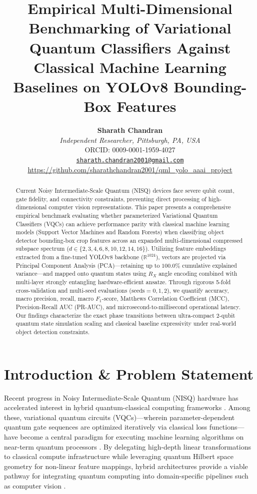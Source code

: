 \documentclass[10pt,twocolumn,letterpaper]{article}
\title{\Large\bfseries Empirical Multi-Dimensional Benchmarking of Variational Quantum Classifiers Against Classical Machine Learning Baselines on YOLOv8 Bounding-Box Features}
\author{
    \textbf{Sharath Chandran} \\
    \textit{Independent Researcher, Pittsburgh, PA, USA} \\
    ORCID: 0009-0001-1959-4027 \\
    \href{mailto:sharath.chandran2001@gmail.com}{\texttt{sharath.chandran2001@gmail.com}} \\
    \url{https://github.com/sharathchandran2001/qml_yolo_aaai_project}
}
\date{}
\begin{document}
\maketitle

\begin{abstract}
Current Noisy Intermediate-Scale Quantum (NISQ) devices face severe qubit count, gate fidelity, and connectivity constraints, preventing direct processing of high-dimensional computer vision representations. This paper presents a comprehensive empirical benchmark evaluating whether parameterized Variational Quantum Classifiers (VQCs) can achieve performance parity with classical machine learning models (Support Vector Machines and Random Forests) when classifying object detector bounding-box crop features across an expanded multi-dimensional compressed subspace spectrum ($d \in \{2, 3, 4, 6, 8, 10, 12, 14, 16\}$). Utilizing feature embeddings extracted from a fine-tuned YOLOv8 backbone ($\mathbb{R}^{1024}$), vectors are projected via Principal Component Analysis (PCA)—retaining up to $100.0\%$ cumulative explained variance—and mapped onto quantum states using $R_X$ angle encoding combined with multi-layer strongly entangling hardware-efficient ansatze. Through rigorous 5-fold cross-validation and multi-seed evaluations ($\text{seeds}=0, 1, 2$), we quantify accuracy, macro precision, recall, macro $F_1$-score, Matthews Correlation Coefficient (MCC), Precision-Recall AUC (PR-AUC), and microsecond-to-millisecond operational latency. Our findings characterize the exact phase transitions between ultra-compact 2-qubit quantum state simulation scaling and classical baseline expressivity under real-world object detection constraints.
\end{abstract}

\section{Introduction \& Problem Statement}

Recent progress in Noisy Intermediate-Scale Quantum (NISQ) hardware has accelerated interest in hybrid quantum-classical computing frameworks \cite{ref5}. Among these, variational quantum circuits (VQCs)—wherein parameter-dependent quantum gate sequences are optimized iteratively via classical loss functions—have become a central paradigm for executing machine learning algorithms on near-term quantum processors \cite{ref1, ref2}. By delegating high-depth linear transformations to classical compute infrastructure while leveraging quantum Hilbert space geometry for non-linear feature mappings, hybrid architectures provide a viable pathway for integrating quantum computing into domain-specific pipelines such as computer vision \cite{ref3, ref4, ref5, ref6}.
\end{document}
